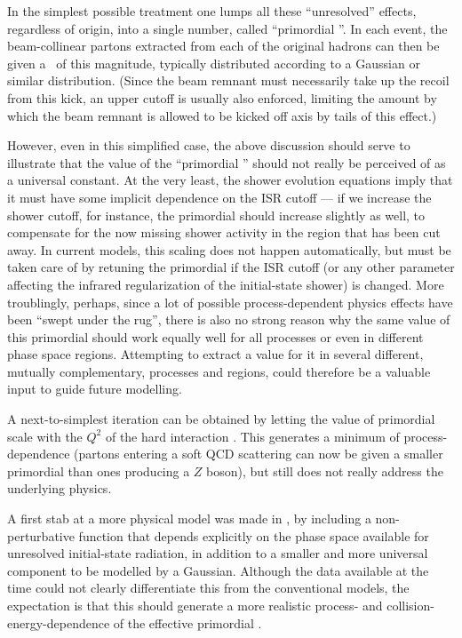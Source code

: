 In the simplest possible treatment one lumps 
all these ``unresolved'' effects, regardless of origin, into 
a single number, called ``primordial \kT''. In each event, the
beam-collinear partons extracted from each of the original hadrons
can then be given a \pt\ of this magnitude, typically distributed
according to a Gaussian or similar distribution. (Since the beam
remnant must necessarily take up the recoil from this kick, 
an upper cutoff is usually also enforced, limiting the amount by
which the beam remnant is allowed to be kicked off axis by 
tails of this effect.)

However, even in this simplified case, the above discussion should serve
to illustrate that the value of the ``primordial \kT'' should not really be
perceived of as a universal constant. At the very least, the shower evolution
equations imply that it must have some  implicit dependence on the ISR cutoff --- 
if we increase the shower cutoff, for instance, 
the primordial \kT should increase slightly as well, to compensate for the now
missing shower activity in the region that has been cut
away. In current models, this scaling does not happen automatically,
but must be taken care of by retuning the primordial \kT if the ISR
cutoff (or any other parameter affecting the infrared regularization
of the initial-state shower) is changed. More troublingly, perhaps, 
since a lot of possible process-dependent physics effects have been
``swept under the rug'', there is also no strong reason why the same 
value of this primordial \kT should work equally well for all
processes or even in different phase space regions. 
Attempting to extract a value for it in several different, mutually
complementary, processes and regions, 
could therefore be a valuable input to guide future modelling. 

A next-to-simplest iteration can be obtained by letting 
the value of primordial \kT scale with the $Q^2$ of the hard
interaction \cite{Sjostrand:2004pf}. This generates a minimum of
process-dependence (\eg partons entering a soft QCD scattering can 
now be given a smaller primordial \kT than ones producing a $Z$
boson), but still does not really address the underlying physics. 

A first stab at a more physical
model was made in \cite{Gieseke:2007ad}, by including a
non-perturbative function that depends explicitly on the phase space
available for unresolved initial-state radiation, in
addition to a smaller and more
universal component to be modelled by a Gaussian. 
Although the data available at the time 
could not clearly differentiate this from the conventional models, 
the expectation is that this should generate a more realistic 
process- and collision-energy-dependence of the effective primordial
\kT.

